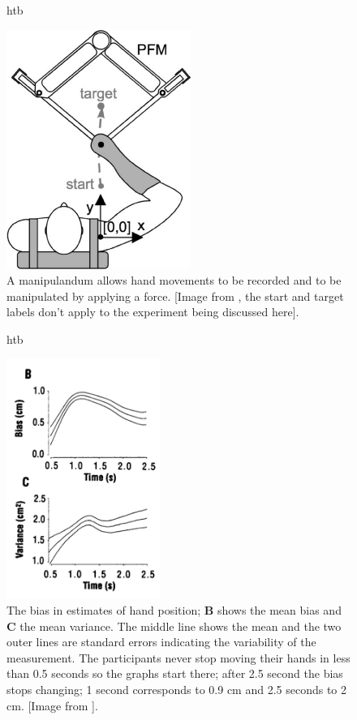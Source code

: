 \documentclass[12pt]{article}
\begin{document}
\begin{figure}{htb}
\begin{center}
  \includegraphics[width=6cm]{manipulandum.jpg}
\end{center}
\caption{A manipulandum allows hand movements to be recorded and to be manipulated by applying a force. [Image from \cite{MistryEt2013}, the start and target labels don't apply to the experiment being discussed here].\label{fig_manipulandum}}
\end{figure}


\begin{figure}{htb}
\begin{center}
  \includegraphics[width=5cm]{fig_overestimate.png}
\end{center}
\caption{The bias in estimates of hand position; \textbf{B} shows the
  mean bias and \textbf{C} the mean variance. The middle line shows
  the mean and the two outer lines are standard errors indicating the
  variability of the measurement. The participants never stop moving their hands in less than 0.5 seconds so the graphs start there; after 2.5 second the bias stops changing; 1 second corresponds to 0.9 cm and 2.5 seconds to 2 cm. [Image from
    \cite{WolpertEtAl1995}].\label{fig_manipulandum}}
\end{figure}
\end{document}
